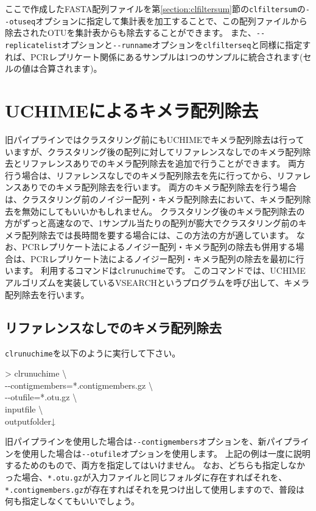 \documentclass[titlepage,10pt,a4paper,english]{jsbook}
\newenvironment{cmd}{\begin{oframed}\raggedright\ttfamily\footnotesize\setlength{\baselineskip}{1.4em}}{\end{oframed}\vspace{-1em}}
\begin{document}
ここで作成したFASTA配列ファイルを第\ref{section:clfiltersum}節の\texttt{clfiltersum}の\texttt{{-}{-}otuseq}オプションに指定して集計表を加工することで、この配列ファイルから除去されたOTUを集計表からも除去することができます。
また、\texttt{{-}{-}replicatelist}オプションと\texttt{{-}{-}runname}オプションを\texttt{clfilterseq}と同様に指定すれば、PCRレプリケート関係にあるサンプルは1つのサンプルに統合されます(セルの値は合算されます)。

\section{UCHIMEによるキメラ配列除去}

旧パイプラインではクラスタリング前にもUCHIMEでキメラ配列除去は行っていますが、クラスタリング後の配列に対してリファレンスなしでのキメラ配列除去とリファレンスありでのキメラ配列除去を追加で行うことができます。
両方行う場合は、リファレンスなしでのキメラ配列除去を先に行ってから、リファレンスありでのキメラ配列除去を行います。
両方のキメラ配列除去を行う場合は、クラスタリング前のノイジー配列・キメラ配列除去において、キメラ配列除去を無効にしてもいいかもしれません。
クラスタリング後のキメラ配列除去の方がずっと高速なので、1サンプル当たりの配列が膨大でクラスタリング前のキメラ配列除去では長時間を要する場合には、この方法の方が適しています。
なお、PCRレプリケート法によるノイジー配列・キメラ配列の除去も併用する場合は、PCRレプリケート法によるノイジー配列・キメラ配列の除去を最初に行います。
利用するコマンドは\texttt{clrunuchime}です。
このコマンドでは、UCHIMEアルゴリズムを実装しているVSEARCHというプログラムを呼び出して、キメラ配列除去を行います。

\subsection{リファレンスなしでのキメラ配列除去}

\texttt{clrunuchime}を以下のように実行して下さい。
\begin{cmd}
{\textgreater} clrunuchime {\textbackslash}\\
{-}{-}contigmembers=*.contigmembers.gz {\textbackslash}\\
{-}{-}otufile=*.otu.gz {\textbackslash}\\
inputfile {\textbackslash}\\
outputfolder↓
\end{cmd}
旧パイプラインを使用した場合は\texttt{{-}{-}contigmembers}オプションを、新パイプラインを使用した場合は\texttt{{-}{-}otufile}オプションを使用します。
上記の例は一度に説明するためのもので、両方を指定してはいけません。
なお、どちらも指定しなかった場合、\texttt{*.otu.gz}が入力ファイルと同じフォルダに存在すればそれを、\texttt{*.contigmembers.gz}が存在すればそれを見つけ出して使用しますので、普段は何も指定しなくてもいいでしょう。
\end{document}

